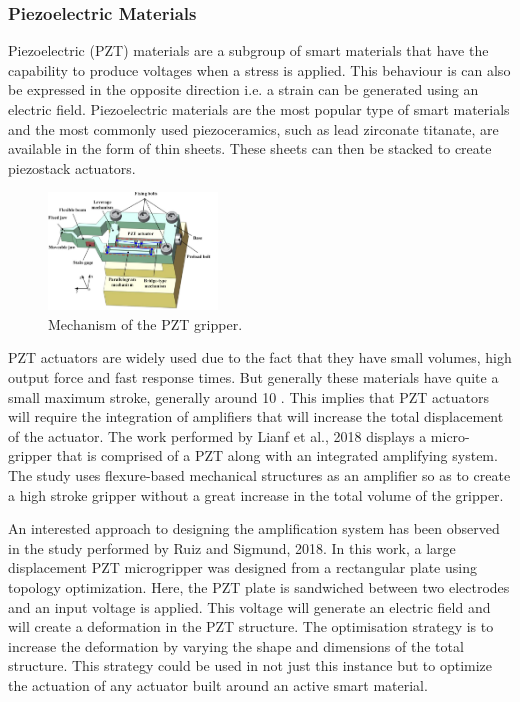 \subsubsection{Piezoelectric Materials}
Piezoelectric (PZT) materials are a subgroup of smart materials that have the capability to produce voltages when a stress is applied. This behaviour is can also be expressed in the opposite direction i.e. a strain can be generated using an electric field. Piezoelectric materials are the most popular type of smart materials and the most commonly used piezoceramics, such as lead zirconate titanate, are available in the form of thin sheets. These sheets can then be stacked to create piezostack actuators.

\begin{figure}
	\centering
	\includegraphics[width=0.4\textwidth]{Figures/PZT_grip.png}
	\caption{Mechanism of the PZT gripper\cite{liang_design_2018}.}
	\label{fig:PZT_grip}
\end{figure}

PZT actuators are widely used due to the fact that they have small volumes, high output force and fast response times. But generally these materials have quite a small maximum stroke, generally around 10 \micrometer. This implies that PZT actuators will require the integration of amplifiers that will increase the total displacement of the actuator. The work performed by Lianf et al., 2018\cite{liang_design_2018} displays a micro-gripper that is comprised of a PZT along with an integrated amplifying system. The study uses flexure-based mechanical structures as an amplifier so as to create a high stroke gripper without a great increase in the total volume of the gripper.

An interested approach to designing the amplification system has been observed in the study performed by Ruiz and Sigmund, 2018\cite{ruiz_optimal_2018}. In this work, a large displacement PZT microgripper was designed from a rectangular plate using topology optimization. Here, the PZT plate is sandwiched between two electrodes and an input voltage is applied. This voltage will generate an electric field and will create a deformation in the PZT structure. The optimisation strategy is to increase the deformation by varying the shape and dimensions of the total structure. This strategy could be used in not just this instance but to optimize the actuation of any actuator built around an active smart material.

